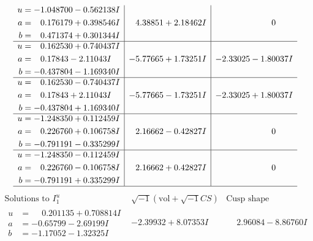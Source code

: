 \documentclass[1p]{elsarticle_modified}
\theoremstyle{definition}
\newcommand{\I}{\sqrt{-1}}
\begin{document}
$$\begin{array}{c|c|c}
\begin{aligned}
u &= -1.048700 - 0.562138 I \\
a &= \phantom{-}0.176179 + 0.398546 I \\
b &= \phantom{-}0.471374 + 0.301344 I\end{aligned}
 & \phantom{-}4.38851 + 2.18462 I & \phantom{-0.000000 } 0 \\ \hline\begin{aligned}
u &= \phantom{-}0.162530 + 0.740437 I \\
a &= \phantom{-}0.17843 - 2.11043 I \\
b &= -0.437804 - 1.169340 I\end{aligned}
 & -5.77665 + 1.73251 I & -2.33025 - 1.80037 I \\ \hline\begin{aligned}
u &= \phantom{-}0.162530 - 0.740437 I \\
a &= \phantom{-}0.17843 + 2.11043 I \\
b &= -0.437804 + 1.169340 I\end{aligned}
 & -5.77665 - 1.73251 I & -2.33025 + 1.80037 I \\ \hline\begin{aligned}
u &= -1.248350 + 0.112459 I \\
a &= \phantom{-}0.226760 + 0.106758 I \\
b &= -0.791191 - 0.335299 I\end{aligned}
 & \phantom{-}2.16662 - 0.42827 I & \phantom{-0.000000 } 0 \\ \hline\begin{aligned}
u &= -1.248350 - 0.112459 I \\
a &= \phantom{-}0.226760 - 0.106758 I \\
b &= -0.791191 + 0.335299 I\end{aligned}
 & \phantom{-}2.16662 + 0.42827 I & \phantom{-0.000000 } 0\\
 \hline 
 \end{array}$$\newpage$$\begin{array}{c|c|c}  
\text{Solutions to }I^u_{1}& \I (\text{vol} + \sqrt{-1}CS) & \text{Cusp shape}\\
 \hline 
\begin{aligned}
u &= \phantom{-}0.201135 + 0.708814 I \\
a &= -0.65799 - 2.69199 I \\
b &= -1.17052 - 1.32325 I\end{aligned}
 & -2.39932 + 8.07353 I & \phantom{-}2.96084 - 8.86760 I \\ \hline\begin{aligned}

\end{aligned}
\end{array}$$
\end{document}
